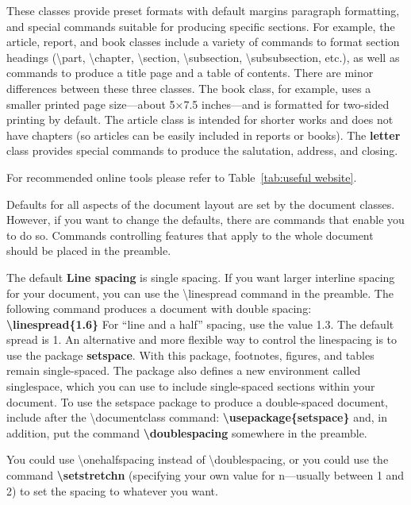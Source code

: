 \documentclass[12pt,openright]{book}
\begin{document}
These classes provide preset formats with default margins paragraph formatting, and special commands suitable for producing specific sections. For example, the article, report, and book classes include a variety of commands to format section headings
(\textbackslash part, \textbackslash chapter, \textbackslash section, \textbackslash subsection, \textbackslash subsubsection, etc.), as well as commands to produce a title page and a table of contents. There are minor differences between these three classes. The book class, for example, uses a smaller printed page size—about 5×7.5 inches—and is formatted for two-sided printing by default. The article class is intended for shorter works and does not have chapters (so articles can be easily included in reports or books). The \textbf{letter} class provides special commands to produce the salutation, address, and closing.


\noindent For recommended online tools please refer to Table~\ref{tab:useful website}.

Defaults for all aspects of the document layout are set by the document classes. However,
if you want to change the defaults, there are commands that enable you to do so.
Commands controlling features that apply to the whole document should be placed in
the preamble.

The default \textbf{Line spacing} is single spacing. If you want larger interline spacing for your document, you can use the \textbackslash linespread command in the preamble. The following command produces a document with double spacing: \textbf{\textbackslash linespread\{1.6\}} For “line and a half” spacing, use the value 1.3. The default spread is 1. An alternative and more flexible way to control the linespacing is to use the package \textbf{setspace}. With this package, footnotes, figures, and tables remain single-spaced. The package also defines a new environment called singlespace, which you can use to include single-spaced sections within your document. To use the setspace package to produce a double-spaced document, include after the \textbackslash documentclass command: \textbf{\textbackslash usepackage\{setspace\}} and, in addition, put the command \textbf{\textbackslash doublespacing} somewhere in the preamble.

You could use \textbackslash onehalfspacing instead of \textbackslash doublespacing, or you could use the command \textbf{\textbackslash setstretch{n}} (specifying your own value for n—usually between 1 and 2) to set the spacing to whatever you want.
\end{document}
